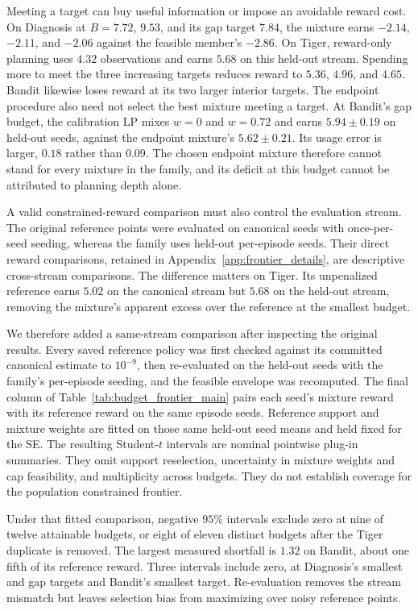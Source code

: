 Meeting a target can buy useful information or impose an avoidable reward cost. On Diagnosis at $B{=}7.72$, $9.53$, and its gap target $7.84$, the mixture earns $-2.14$, $-2.11$, and $-2.06$ against the feasible member's $-2.86$. On Tiger, reward-only planning uses $4.32$ observations and earns $5.68$ on this held-out stream. Spending more to meet the three increasing targets reduces reward to $5.36$, $4.96$, and $4.65$. Bandit likewise loses reward at its two larger interior targets. The endpoint procedure also need not select the best mixture meeting a target. At Bandit's gap budget, the calibration LP mixes $w{=}0$ and $w{=}0.72$ and earns $5.94\pm0.19$ on held-out seeds, against the endpoint mixture's $5.62\pm0.21$. Its usage error is larger, $0.18$ rather than $0.09$. The chosen endpoint mixture therefore cannot stand for every mixture in the family, and its deficit at this budget cannot be attributed to planning depth alone.

A valid constrained-reward comparison must also control the evaluation stream. The original reference points were evaluated on canonical seeds with once-per-seed seeding, whereas the family uses held-out per-episode seeds. Their direct reward comparisons, retained in Appendix~\ref{app:frontier_details}, are descriptive cross-stream comparisons. The difference matters on Tiger. Its unpenalized reference earns $5.02$ on the canonical stream but $5.68$ on the held-out stream, removing the mixture's apparent excess over the reference at the smallest budget.

We therefore added a same-stream comparison after inspecting the original results. Every saved reference policy was first checked against its committed canonical estimate to $10^{-9}$, then re-evaluated on the held-out seeds with the family's per-episode seeding, and the feasible envelope was recomputed. The final column of Table~\ref{tab:budget_frontier_main} pairs each seed's mixture reward with its reference reward on the same episode seeds. Reference support and mixture weights are fitted on those same held-out seed means and held fixed for the SE. The resulting Student-$t$ intervals are nominal pointwise plug-in summaries. They omit support reselection, uncertainty in mixture weights and cap feasibility, and multiplicity across budgets. They do not establish coverage for the population constrained frontier.

Under that fitted comparison, negative $95\%$ intervals exclude zero at nine of twelve attainable budgets, or eight of eleven distinct budgets after the Tiger duplicate is removed. The largest measured shortfall is $1.32$ on Bandit, about one fifth of its reference reward. Three intervals include zero, at Diagnosis's smallest and gap targets and Bandit's smallest target. Re-evaluation removes the stream mismatch but leaves selection bias from maximizing over noisy reference points.

